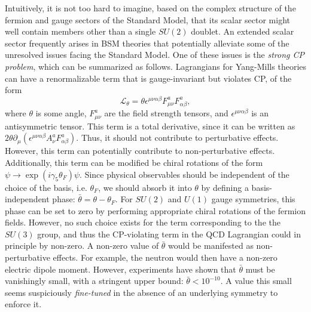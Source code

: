 Intuitively, it is not too hard to imagine, based on the complex structure of the fermion and gauge sectors of the Standard Model, that its scalar sector might well contain members other than a single $SU(2)$ doublet. An extended scalar sector frequently arises in BSM theories that potentially alleviate some of the unresolved issues facing the Standard Model.
One of these issues is the \emph{strong CP problem}, which can be summarized as follows. Lagrangians for Yang-Mills theories can have a renormalizable term that is gauge-invariant but violates CP, of the form
\[\mathcal{L}_{\theta} = \theta\epsilon^{\mu\nu\alpha\beta}F_{\mu\nu}^aF_{\alpha\beta}^a,\]
where $\theta$ is some angle, $F_{\mu\nu}^a$ are the field strength tensors, and $\epsilon^{\mu\nu\alpha\beta}$ is an antisymmetric tensor. This term is a total derivative, since it can be written as $2\theta\partial_\mu(\epsilon^{\mu\nu\alpha\beta}A_\nu^aF_{\alpha\beta}^a)$. Thus, it should not contribute to perturbative effects. However, this term can potentially contribute to non-perturbative effects. Additionally, this term can be modified be chiral rotations of the form $\psi\rightarrow \exp(i\gamma_5\theta_F)\psi$. Since physical observables should be independent of the choice of the basis, i.e. $\theta_F$, we should absorb it into $\theta$ by defining a basis-independent phase: $\bar{\theta} = \theta-\theta_F$. For $SU(2)$ and $U(1)$ gauge symmetries, this phase can be set to zero by performing appropriate chiral rotations of the fermion fields. However, no such choice exists for the term corresponding to the the $SU(3)$ group, and thus the CP-violating term in the QCD Lagrangian could in principle by non-zero. A non-zero value of $\bar{\theta}$ would be manifested as non-perturbative effects. For example, the neutron would then have a non-zero electric dipole moment. However, experiments have shown that $\bar{\theta}$ must be vanishingly small, with a stringent upper bound: $\bar{\theta}<10^{-10}$. A value this small seems suspiciously \emph{fine-tuned} in the absence of an underlying symmetry to enforce it.

